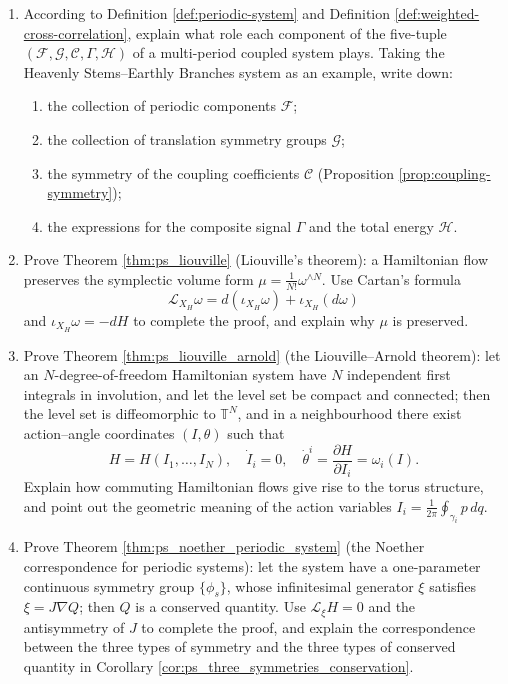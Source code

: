 \begin{enumerate}[leftmargin=3em, label=\textbf{Exercise \arabic*}]
    \item According to Definition \ref{def:periodic-system} and Definition \ref{def:weighted-cross-correlation},
    explain what role each component of the five-tuple $(\mathcal{F},\mathcal{G},\mathcal{C},\Gamma,\mathcal{H})$
    of a multi-period coupled system plays.
    Taking the Heavenly Stems--Earthly Branches system as an example, write down:
    \begin{enumerate}[label=(\roman*)]
        \item the collection of periodic components $\mathcal{F}$;
        \item the collection of translation symmetry groups $\mathcal{G}$;
        \item the symmetry of the coupling coefficients $\mathcal{C}$ (Proposition \ref{prop:coupling-symmetry});
        \item the expressions for the composite signal $\Gamma$ and the total energy $\mathcal{H}$.
    \end{enumerate}

    \item Prove Theorem \ref{thm:ps_liouville} (Liouville's theorem):
    a Hamiltonian flow preserves the symplectic volume form $\mu=\frac1{N!}\omega^{\wedge N}$.
    Use Cartan's formula
    \[
    \mathcal{L}_{X_H}\omega=d(\iota_{X_H}\omega)+\iota_{X_H}(d\omega)
    \]
    and $\iota_{X_H}\omega=-dH$ to complete the proof,
    and explain why $\mu$ is preserved.

    \item Prove Theorem \ref{thm:ps_liouville_arnold} (the Liouville--Arnold theorem):
    let an $N$-degree-of-freedom Hamiltonian system have $N$ independent first integrals in involution,
    and let the level set be compact and connected; then the level set is diffeomorphic to $\mathbb{T}^N$,
    and in a neighbourhood there exist action--angle coordinates $(I,\theta)$ such that
    \[
    H=H(I_1,\dots,I_N),\quad
    \dot{I}_i=0,\quad
    \dot{\theta}^i=\frac{\partial H}{\partial I_i}=\omega_i(I).
    \]
    Explain how commuting Hamiltonian flows give rise to the torus structure,
    and point out the geometric meaning of the action variables $I_i=\frac1{2\pi}\oint_{\gamma_i}p\,dq$.

    \item Prove Theorem \ref{thm:ps_noether_periodic_system} (the Noether correspondence for periodic systems):
    let the system have a one-parameter continuous symmetry group $\{\phi_s\}$,
    whose infinitesimal generator $\xi$ satisfies $\xi=J\nabla Q$;
    then $Q$ is a conserved quantity.
    Use $\mathcal{L}_\xi H=0$ and the antisymmetry of $J$ to complete the proof,
    and explain the correspondence between the three types of symmetry and the three types of conserved quantity
    in Corollary \ref{cor:ps_three_symmetries_conservation}.


\end{enumerate}
